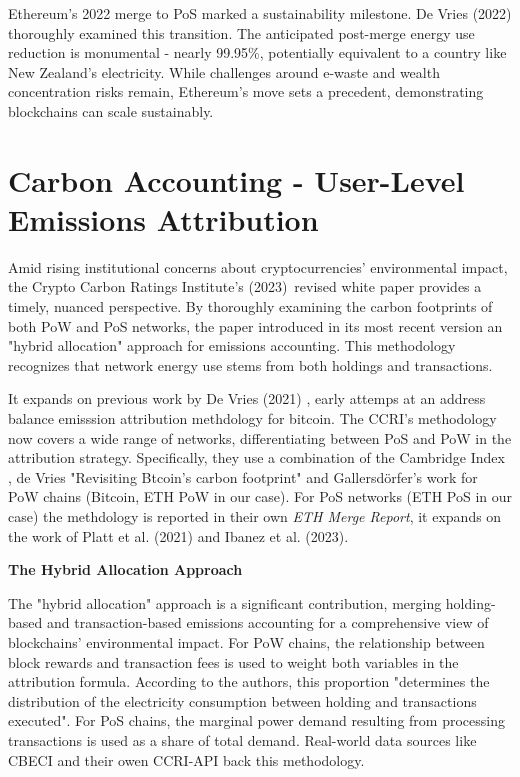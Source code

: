 \documentclass[11pt]{report}
\begin{document}
Ethereum's 2022 merge to PoS marked a sustainability milestone. De Vries (2022)\cite{devriesCryptocurrenciesRoadSustainability2022} thoroughly examined this transition. The anticipated post-merge energy use reduction is monumental - nearly 99.95\%, potentially equivalent to a country like New Zealand's electricity. While challenges around e-waste and wealth concentration risks remain, Ethereum's move sets a precedent, demonstrating blockchains can scale sustainably.

\section{Carbon Accounting - User-Level Emissions Attribution}

Amid rising institutional concerns about cryptocurrencies' environmental impact, the Crypto Carbon Ratings Institute's (2023)\ revised white paper provides a timely, nuanced perspective. By thoroughly examining the carbon footprints of both PoW and PoS networks, the paper introduced in its most recent version an "hybrid allocation" approach for emissions accounting. This methodology recognizes that network energy use stems from both holdings and transactions.

It expands on previous work by De Vries (2021) \cite{devriesTrueCostsDigital2021}, early attemps at an address balance emisssion attribution methdology for bitcoin. The CCRI's methodology now covers a wide range of networks, differentiating between PoS and PoW in the attribution strategy. Specifically, they use a combination of the Cambridge Index \cite{neumuellerCambridgeBitcoinElectricity2021}, de Vries "Revisiting Btcoin's carbon footprint" \cite{devriesRevisitingBitcoinCarbon2022} and Gallersdörfer's work \cite{gallersdorferEnergyConsumptionCryptocurrencies2020} for PoW chains (Bitcoin, ETH PoW in our case). For PoS networks (ETH PoS in our case) the methdology is reported in their own \textit{ETH Merge Report}\cite{ETHMergeReport}, it expands on the work of Platt et al. (2021)\cite{plattEnergyFootprintBlockchain2021} and Ibanez et al. (2023)\cite{ibanezEnergyConsumptionProofofStake2023}.

\textbf{The Hybrid Allocation Approach}

The "hybrid allocation" approach is a significant contribution, merging holding-based and transaction-based emissions accounting for a comprehensive view of blockchains' environmental impact. For PoW chains, the relationship between block rewards and transaction fees is used to weight both variables in the attribution formula. According to the authors, this proportion "determines the distribution of the electricity consumption between holding and transactions executed". For PoS chains, the marginal power demand resulting from processing transactions is used as a share of total demand. Real-world data sources like CBECI and their owen CCRI-API back this methodology.
\end{document}
